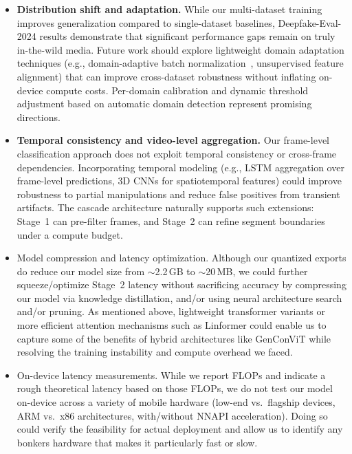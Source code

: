 \begin{itemize}[leftmargin=*,itemsep=2pt,parsep=0pt]
  \item \textbf{Distribution shift and adaptation.} While our multi\hyp dataset training improves generalization compared to single\hyp dataset baselines, Deepfake\hyp Eval\hyp 2024 results demonstrate that significant performance gaps remain on truly in\hyp the\hyp wild media. Future work should explore lightweight domain adaptation techniques (e.g., domain\hyp adaptive batch normalization~\cite{li2021dabn}, unsupervised feature alignment) that can improve cross\hyp dataset robustness without inflating on\hyp device compute costs. Per\hyp domain calibration and dynamic threshold adjustment based on automatic domain detection represent promising directions.

  \item \textbf{Temporal consistency and video\hyp level aggregation.} Our frame\hyp level classification approach does not exploit temporal consistency or cross\hyp frame dependencies. Incorporating temporal modeling (e.g., LSTM aggregation over frame\hyp level predictions, 3D CNNs for spatiotemporal features) could improve robustness to partial manipulations and reduce false positives from transient artifacts. The cascade architecture naturally supports such extensions: Stage~1 can pre\hyp filter frames, and Stage~2 can refine segment boundaries under a compute budget.

  \item Model compression and latency optimization. Although our quantized exports do reduce our model size from $\sim$2.2\,GB to $\sim$20\,MB, we could further squeeze/optimize Stage~2 latency without sacrificing accuracy by compressing our model via knowledge distillation, and/or using neural architecture search and/or pruning. As mentioned above, lightweight transformer variants or more efficient attention mechanisms such as Linformer could enable us to capture some of the benefits of hybrid architectures like GenConViT while resolving the training instability and compute overhead we faced.

  \item On\hyp device latency measurements. While we report FLOPs and indicate a rough theoretical latency based on those FLOPs, we do not test our model on\hyp device across a variety of mobile hardware (low\hyp end vs.\ flagship devices, ARM vs.\ x86 architectures, with/without NNAPI acceleration). Doing so could verify the feasibility for actual deployment and allow us to identify any bonkers hardware that makes it particularly fast or slow.


\end{itemize}
